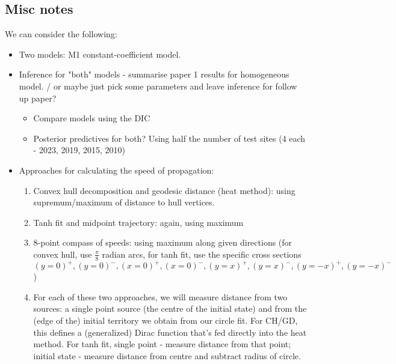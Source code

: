 \documentclass[9pt, reqno]{amsart}
\numberwithin{equation}{section}
\renewcommand{\(}{\left(}
\renewcommand{\)}{\right)}
\theoremstyle{definition}
\theoremstyle{definition}
\theoremstyle{definition}
\begin{document}
	\subsection*{Misc notes} 
	We can consider the following:
                \begin{itemize}
                    \item Two models: M1 constant-coefficient model. 
                    \item Inference for "both" models - summarise paper 1 results for homogeneous model. / or maybe just pick some parameters and leave inference for follow up paper?
		              \begin{itemize}
		                  \item Compare models using the DIC 
		              \end{itemize}
		              \begin{itemize}
		                  \item Posterior predictives for both? Using half the number of test sites (4 each - 2023, 2019, 2015, 2010)
		              \end{itemize}
                    \item Approaches for calculating the speed of propagation:
                        \begin{enumerate}
                            \item Convex hull decomposition and geodesic distance (heat method): using supremum/maximum of distance to hull vertices.
                            \item Tanh fit and midpoint trajectory: again, using maximum 
                            \item 8-point compass of speeds: using maximum along given directions (for convex hull, use $\frac{\pi}{8}$ radian arcs, for tanh fit, use the specific cross sections $(y=0)^+, (y=0)^-, (x=0)^+, (x=0)^-, (y=x)^+, (y=x)^-, (y=-x)^+, (y=-x)^-$ )
                            \item For each of these two approaches, we will measure distance from two sources: a single point source (the centre of the initial state) and from the (edge of the) initial territory we obtain from our circle fit. For CH/GD, this defines a (generalized) Dirac function that's fed directly into the heat method. For tanh fit, single point - measure distance from that point; initial state - measure distance from centre and subtract radius of circle.
                        \end{enumerate}
                \end{itemize}
	
\end{document}

